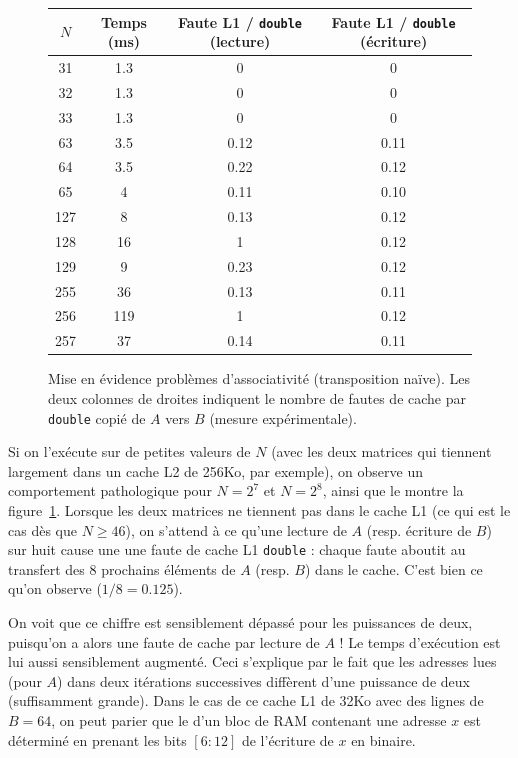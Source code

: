 \begin{figure}
\centering
\begin{tabular}{|c|c|c|c|}
  \hline
  $N$ & Temps (ms) & Faute L1 / \texttt{double} (lecture) & Faute L1 / \texttt{double} (écriture) \\ 
  \hline
  31 & 1.3         & 0 & 0 \\
  32 & 1.3         & 0 & 0 \\
  33 & 1.3         & 0 & 0 \\
  \hline
  63 & 3.5         & 0.12 & 0.11 \\
  64 & 3.5         & 0.22 & 0.12 \\
  65 & 4           & 0.11 & 0.10 \\
  \hline
  127 & 8          & 0.13 & 0.12 \\
  128 & 16         & 1    & 0.12 \\
  129 & 9          & 0.23 & 0.12 \\
  \hline
  255 & 36         & 0.13 & 0.11 \\
  256 & 119        & 1    & 0.12 \\
  257 & 37         & 0.14 & 0.11 \\
  \hline
\end{tabular}
\caption{Mise en évidence problèmes d'associativité (transposition naïve). Les
  deux colonnes de droites indiquent le nombre de fautes de cache par
  \texttt{double} copié de $A$ vers $B$ (mesure expérimentale). \label{tab:pb-associativity}}
\end{figure}

Si on l'exécute sur de petites valeurs de $N$ (avec les deux matrices qui
tiennent largement dans un cache L2 de 256Ko, par exemple), on observe un
comportement pathologique pour $N=2^7$ et $N= 2^8$, ainsi que le montre la
figure~\ref{tab:pb-associativity}. Lorsque les deux matrices ne tiennent pas
dans le cache L1 (ce qui est le cas dès que $N \geq 46$), on s'attend à ce
qu'une lecture de $A$ (resp. écriture de $B$) sur huit cause une une faute de
cache L1 \texttt{double} : chaque faute aboutit au transfert des 8 prochains
éléments de $A$ (resp. $B$) dans le cache. C'est bien ce qu'on observe
($1/8 = 0.125$).

On voit que ce chiffre est sensiblement dépassé pour les puissances de deux,
puisqu'on a alors une faute de cache par lecture de $A$ ! Le temps d'exécution
est lui aussi sensiblement augmenté. Ceci s'explique par le fait que les
adresses lues (pour $A$) dans deux itérations successives diffèrent d'une
puissance de deux (suffisamment grande). Dans le cas de ce cache L1 de 32Ko avec
des lignes de $B=64$, on peut parier que le  d'un bloc de RAM
contenant une adresse $x$ est déterminé en prenant les bits $[6:12]$ de
l'écriture de $x$ en binaire.

